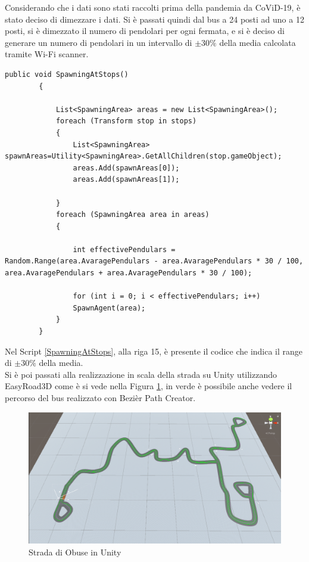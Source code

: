 \documentclass[12pt, openany]{book}
\begin{document}
 	Considerando che i dati sono stati raccolti prima della pandemia da CoViD-19, è stato deciso di dimezzare i dati. Si è passati quindi dal bus a 24 posti ad uno a 12 posti, si è dimezzato il numero di pendolari per ogni fermata, e si è deciso di generare un numero di pendolari in un intervallo di $\pm30\%$ della media calcolata tramite Wi-Fi scanner.
 	\begin{lstlisting}[language={[Sharp]C}, 
 		caption={Genera i pendolari alle fermate}, label={SpawningAtStops}]
 		   public void SpawningAtStops()
 		{
 			
 			List<SpawningArea> areas = new List<SpawningArea>();
 			foreach (Transform stop in stops)
 			{
 				List<SpawningArea> spawnAreas=Utility<SpawningArea>.GetAllChildren(stop.gameObject);
 				areas.Add(spawnAreas[0]);
 				areas.Add(spawnAreas[1]);
 				
 			}
 			foreach (SpawningArea area in areas)
 			{
 				
 				int effectivePendulars = Random.Range(area.AvaragePendulars - area.AvaragePendulars * 30 / 100, area.AvaragePendulars + area.AvaragePendulars * 30 / 100);
 				
 				for (int i = 0; i < effectivePendulars; i++)
 				SpawnAgent(area);
 			}
 		}
 	\end{lstlisting}
 	Nel Script \ref{SpawningAtStops}, alla riga 15, è presente il codice che indica il range di $\pm30\%$ della media.\\
 	Si è poi passati alla realizzazione in scala della strada su Unity utilizzando EasyRoad3D come è si vede nella Figura \ref{fig:ObuseStreet}, in verde è possibile anche vedere il percorso del bus realizzato con Bezièr Path Creator. 
 	\begin{figure}[H]
 		\centering
 		\includegraphics[width=1\linewidth]{"Immagini/ObuseStreet.png"}
 		\caption{Strada di Obuse in Unity}
 		\label{fig:ObuseStreet}
 	\end{figure}
 
\end{document}
